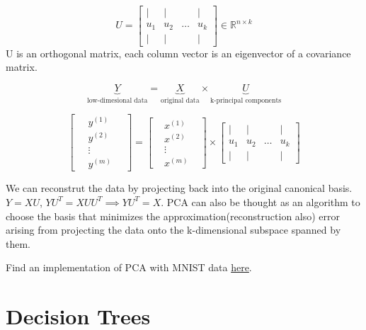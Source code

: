 \documentclass[12pt]{article}
\begin{document}
$$ U =\begin{bmatrix} 
\vert & \vert&  &\vert \\
u_{1} & u_{2} & \hdots & u_{k}\\
 
 \vert & \vert&  &\vert
 \end{bmatrix}  \in \mathbb{R}^{n \times k}$$ U is an orthogonal matrix, each column vector is an eigenvector of a  covariance matrix.
 
 $$\underbrace{Y}_\text{low-dimesional  data}= \underbrace{X} _\text{original data}  \times \underbrace{U}_\text{k-principal components}$$
 
$$ \begin{bmatrix} 
\	& y^{(1)} & \ \\
\	& y^{(2)} & \ \\
\	& \vdots &  \ \\
\	& y^{(m)} &\
\end{bmatrix}   =
 \begin{bmatrix} 
	& x^{(1)} &  \\
	& x^{(2)} &\\
	& \vdots & \\
	& x^{(m)} &
\end{bmatrix}  \times 
 \begin{bmatrix} 
	\vert & \vert&  &\vert \\
	u_{1} & u_{2} & \hdots & u_{k}\\
	
	\vert & \vert&  &\vert
\end{bmatrix}  $$


We can reconstrut the data by projecting back into the original canonical basis. $Y = XU$, $YU^{T} = XUU^{T} \implies YU^{T} = X$.
PCA can also be thought as an algorithm to choose the basis that minimizes the approximation(reconstruction also) error arising from projecting the
data onto the k-dimensional subspace spanned by them.

 
 Find an implementation of PCA with MNIST data \href{https://github.com/aswin16/ML-REPORT/blob/master/codes/PCA.ipynb}{here}.
 
 \section{Decision Trees}
 
\end{document}
